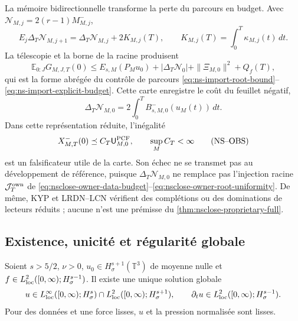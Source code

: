 La mémoire bidirectionnelle transforme la perte du parcours en budget. Avec \(\mathcal N_{M,j}=2(r-1)M_{M,j}^-\),
\begin{equation}
 E_j\Delta_T\mathcal N_{M,j+1}
 =\Delta_T\mathcal N_{M,j}+2K_{M,j}(T),
 \qquad
 K_{M,j}(T)=\int_0^T\kappa_{M,j}(t)\,dt.
 \label{eq:nsclose-carry-memory-telescope}
\end{equation}
La télescopie et la borne de la racine produisent
\begin{equation}
 \mathbb E_{0:J}G_{M,J,T}(0)
 \le E_{s,M}(P_Mu_0)+|\Delta_T\mathcal N_0|
 +\|\Xi_{M,0}\|^2+Q_f(T),
 \label{eq:nsclose-owner-terminal-bound}
\end{equation}
qui est la forme abrégée du contrôle de parcours \eqref{eq:ns-import-root-bound}--\eqref{eq:ns-import-explicit-budget}. Cette carte enregistre le coût du feuillet négatif,
\[
 \Delta_T\mathcal N_{M,0}
 =2\int_0^T B^-_{s,M,0}(u_M(t))\,dt.
\]
Dans cette représentation réduite, l'inégalité
\[
 X^-_{M,T}(0)\preceq C_T\mathsf U^{\rm PCF}_{M,0},
 \qquad \sup_M C_T<\infty
 \tag{NS--OBS}
\]
est un falsificateur utile de la carte. Son échec ne se transmet pas au développement de référence, puisque \(\Delta_T\mathcal N_{M,0}\) ne remplace pas l'injection racine \(\mathcal J_T^{\rm own}\) de \eqref{eq:nsclose-owner-data-budget}--\eqref{eq:nsclose-owner-root-uniformity}. De même, KYP et LRDN--LCN vérifient des complétions ou des dominations de lecteurs réduits ; aucune n'est une prémisse du \cref{thm:nsclose-proprietary-full}.

\subsection{Existence, unicité et régularité globale}

\begin{theorem}
\label{thm:nsclose-global-smooth}
\label{thm:realizaciones-ns}
Soient \(s>5/2\), \(\nu>0\), \(u_0\in H^{s+1}_\sigma(\mathbb T^3)\) de moyenne nulle et \(f\in L^2_{\rm loc}([0,\infty);H^{s-1}_\sigma)\). Il existe une unique solution globale
\begin{equation}
 u\in L^\infty_{\rm loc}([0,\infty);H^s_\sigma)
 \cap L^2_{\rm loc}([0,\infty);H^{s+1}_\sigma),
 \qquad
 \partial_tu\in L^2_{\rm loc}([0,\infty);H^{s-1}_\sigma).
 \label{eq:nsclose-global-regularity-class}
\end{equation}
Pour des données et une force lisses, \(u\) et la pression normalisée sont lisses.
\end{theorem}

